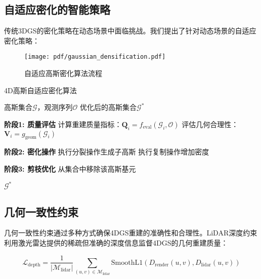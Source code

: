 \subsection{自适应密化的智能策略}

传统3DGS的密化策略在动态场景中面临挑战。我们提出了针对动态场景的自适应密化策略：

\begin{figure}[htbp]
  \centering
  \texttt{[image: pdf/gaussian\_densification.pdf]}
  \caption{自适应高斯密化算法流程}
  \label{fig:gaussian-densification}
\end{figure}

\begin{algorithm}
\caption{4D高斯自适应密化算法}
\label{alg:adaptive_densification}
\begin{algorithmic}[1]
\REQUIRE 高斯集合$\mathcal{G}$，观测序列$\mathcal{O}$
\ENSURE 优化后的高斯集合$\mathcal{G}^*$

\STATE \textbf{阶段1: 质量评估}
    \STATE 计算重建质量指标：$\mathbf{Q}_i = f_{\text{eval}}(\mathcal{G}_i, \mathcal{O})$
    \STATE 评估几何合理性：$\mathbf{V}_i = g_{\text{geom}}(\mathcal{G}_i)$
\ENDFOR

\STATE \textbf{阶段2: 密化操作}
            \STATE 执行分裂操作生成子高斯
        \ELSE
            \STATE 执行复制操作增加密度
        \ENDIF
    \ENDIF
\ENDFOR

\STATE \textbf{阶段3: 剪枝优化}
        \STATE 从集合中移除该高斯基元
    \ENDIF
\ENDFOR

\RETURN $\mathcal{G}^*$
\end{algorithmic}
\end{algorithm}

\subsection{几何一致性约束}

几何一致性约束通过多种方式确保4DGS重建的准确性和合理性。LiDAR深度约束利用激光雷达提供的稀疏但准确的深度信息监督4DGS的几何重建质量：

\begin{equation}
\mathcal{L}_{\text{depth}} = \frac{1}{|\mathcal{M}_{\text{lidar}}|} \sum_{(u,v) \in \mathcal{M}_{\text{lidar}}} \text{SmoothL1}(D_{\text{render}}(u,v), D_{\text{lidar}}(u,v))
\label{eq:lidar_depth_constraint}
\end{equation}

